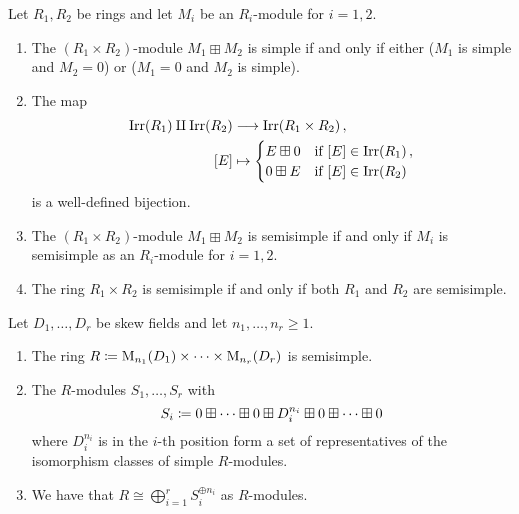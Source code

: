 \begin{proposition}
  \label{proposition: product of semisimple}
  Let $R_1, R_2$ be rings and let $M_i$ be an $R_i$-module for $i = 1, 2$.
  \begin{enumerate}
    \item
      The $(R_1 \times R_2)$-module $M_1 \boxplus M_2$ is simple if and only if either ($M_1$ is simple and $M_2 = 0$) or ($M_1 = 0$ and $M_2$ is simple).
    \item
      The map
      \begin{align*}
                  \operatorname{Irr}(R_1) \amalg \operatorname{Irr}(R_2)
        &\longrightarrow  \operatorname{Irr}(R_1 \times R_2) \,,
        \\
                  [E]
        &\mapsto  \begin{cases}
                    E \boxplus 0  & \text{if $[E] \in \operatorname{Irr}(R_1)$} \,, \\
                    0 \boxplus E  & \text{if $[E] \in \operatorname{Irr}(R_2)$}
                  \end{cases}
      \end{align*}
      is a well-defined bijection.
    \item
      The $(R_1 \times R_2)$-module $M_1 \boxplus M_2$ is semisimple if and only if $M_i$ is semisimple as an $R_i$-module for $i = 1, 2$.
    \item
      The ring $R_1 \times R_2$ is semisimple if and only if both $R_1$ and $R_2$ are semisimple.
  \end{enumerate}
\end{proposition}


\begin{corollary}
  \label{corollary: artin wedderburn rings are semisimple}
  Let $D_1, \dotsc, D_r$ be skew fields and let $n_1, \dotsc, n_r \geq 1$.
  \begin{enumerate}
    \item
      The ring $R \coloneqq  \operatorname{M}_{n_1}(D_1) \times \dotsb \times  \operatorname{M}_{n_r}(D_r)$ is semisimple.
    \item
      The $R$-modules $S_1, \dotsc, S_r$ with
      \[
                  S_i
        \coloneqq  0 \boxplus \dotsb \boxplus 0 \boxplus D_i^{n_i} \boxplus 0 \boxplus \dotsb \boxplus 0
      \]
      where $D_i^{n_i}$ is in the $i$-th position form a set of representatives of the isomorphism classes of simple $R$-modules.
    \item
      We have that $R \cong \bigoplus_{i=1}^r S_i^{\oplus n_i}$ as $R$-modules.
  \end{enumerate}
\end{corollary}


